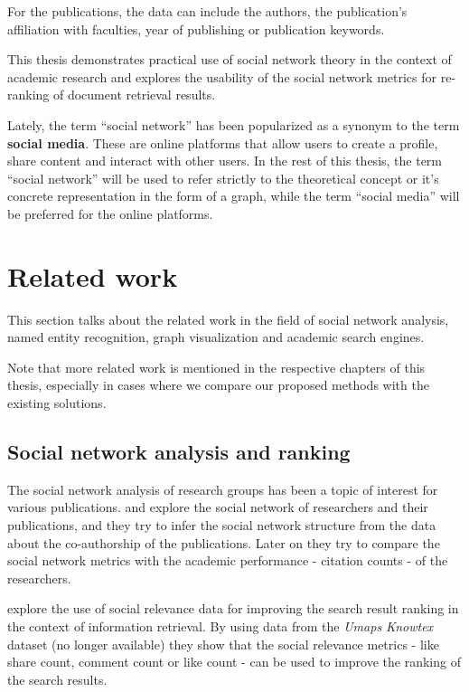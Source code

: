 For the publications, the data can include the authors, the publication's affiliation with faculties, year of publishing or publication keywords.

This thesis demonstrates practical use of social network theory in the context of academic research and explores the usability of the social network metrics for re-ranking of document retrieval results.

Lately, the term ``social network'' has been popularized as a synonym to the term \textbf{social media}.
These are online platforms that allow users to create a profile, share content and interact with other users.
In the rest of this thesis, the term ``social network'' will be used to refer strictly to the theoretical concept or it's concrete representation in the form of a graph, while the term ``social media'' will be preferred for the online platforms.

\section*{Related work}

This section talks about the related work in the field of social network analysis, named entity recognition, graph visualization and academic search engines.

Note that more related work is mentioned in the respective chapters of this thesis,
especially in cases where we compare our proposed methods with the existing solutions.

\subsection*{Social network analysis and ranking}

The social network analysis of research groups has been a topic of interest for various publications. 
\cite{ORDOOBADI2019S164} and \cite{CIMENLER2014667} explore the social network of researchers and their publications, and they try to infer the 
social network structure from the data about the co-authorship of the publications. 
Later on they try to compare the social network metrics with the academic performance - citation counts - of the researchers.

\cite{social-relevance-for-re-ranking-documents} explore the use of social relevance data for improving the search result ranking in the context of information retrieval.
By using data from the \textit{Umaps Knowtex} dataset (no longer available) they show that the social relevance metrics - like share count, comment count or like count - can be used to improve the ranking of the search results.

